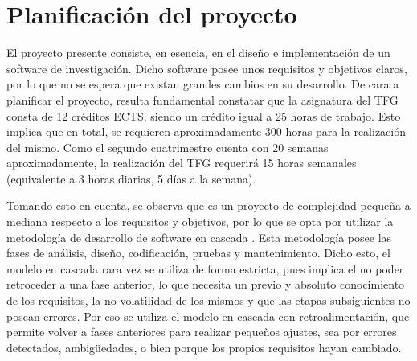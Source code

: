 \section{Planificación del proyecto}



El proyecto presente consiste, en esencia, en el diseño e implementación de un software de investigación. Dicho software posee unos requisitos y objetivos claros, por lo que no se espera que existan grandes cambios en su desarrollo. De cara a planificar el proyecto, resulta fundamental constatar que la asignatura del TFG consta de 12 créditos ECTS, siendo un crédito igual a 25 horas de trabajo. Esto implica que en total, se requieren aproximadamente 300 horas para la realización del mismo. Como el segundo cuatrimestre cuenta con 20 semanas aproximadamente, la realización del TFG requerirá 15 horas semanales (equivalente a 3 horas diarias, 5 días a la semana).

Tomando esto en cuenta, se observa que es un proyecto de complejidad pequeña a mediana respecto a los requisitos y objetivos, por lo que se opta por utilizar la metodología de desarrollo de software en cascada \cite{pressman2005software}. Esta metodología posee las fases de análisis, diseño, codificación, pruebas y mantenimiento. Dicho esto, el modelo en cascada rara vez se utiliza de forma estricta, pues implica el no poder retroceder a una fase anterior, lo que necesita un previo y absoluto conocimiento de los requisitos, la no volatilidad de los mismos y que las etapas subsiguientes no posean errores. Por eso se utiliza el modelo en cascada con retroalimentación, que permite volver a fases anteriores para realizar pequeños ajustes, sea por errores detectados, ambigüedades, o bien porque los propios requisitos hayan cambiado.

